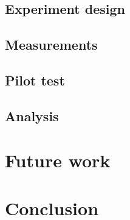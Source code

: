 \documentclass[conference]{IEEEtran}
\begin{document}
\subsection{Experiment design}
\label{sec:design}


\subsection{Measurements}
\label{sec:measurements}


\subsection{Pilot test}
\label{sec:pilot_test}

\subsection{Analysis}
\label{sec:analysis}


\section{Future work}


\section{Conclusion}




\vspace{12pt}
\end{document}
